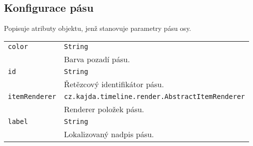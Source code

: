 {	\subsection*{Konfigurace pásu}
	Popisuje atributy objektu, jenž stanovuje parametry pásu osy.
	\begin{longtable}{|p{}p{}|}
		\hline
		{\tt color} & {\tt String}\\
		& Barva pozadí pásu. \\
		\hline
		{\tt id} & {\tt String}\\
		& Řetězcový identifikátor pásu. \\
		\hline
		{\tt itemRenderer} & {\tt cz.kajda.timeline.render.AbstractItemRenderer}\\
		& Renderer položek pásu. \\
		\hline
		{\tt label} & {\tt String}\\
		& Lokalizovaný nadpis pásu. \\
		\hline
	\end{longtable}
	
}
